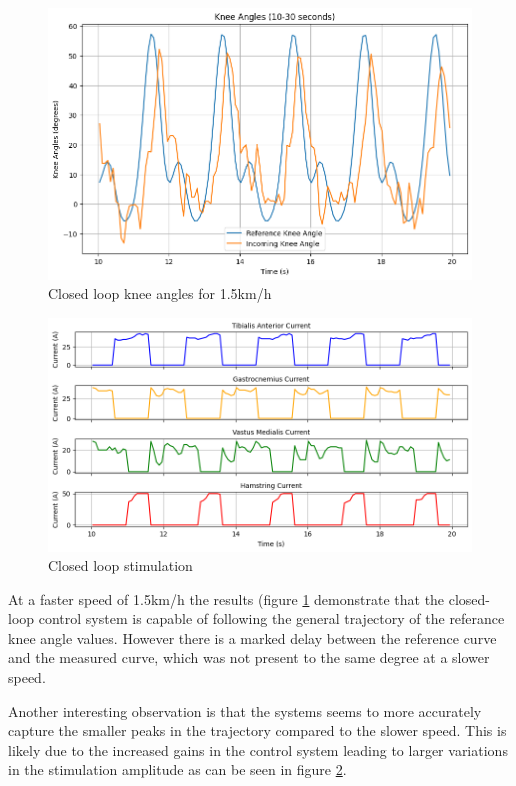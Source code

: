 \begin{figure} [H]
    \centering
    \includegraphics[width=0.9\linewidth]{images/CL12ref.png}
    \caption{Closed loop knee angles for 1.5km/h}
    \label{fig:cl12ref}
\end{figure}

\begin{figure} [H]
    \centering
    \includegraphics[width=0.9\linewidth]{images/CL12stim.png}
    \caption{Closed loop stimulation}
    \label{fig:cl12stim}
\end{figure}


At a faster speed of 1.5km/h the results (figure \ref{fig:cl12ref} demonstrate that the closed-loop control system is capable of following the general trajectory of the referance knee angle values. However there is a marked delay between the reference curve and the measured curve, which was not present to the same degree at a slower speed.

Another interesting observation is that the systems seems to more accurately capture the smaller peaks in the trajectory compared to the slower speed. This is likely due to the increased gains in the control system leading to larger variations in the stimulation amplitude as can be seen in figure \ref{fig:cl12stim}.

